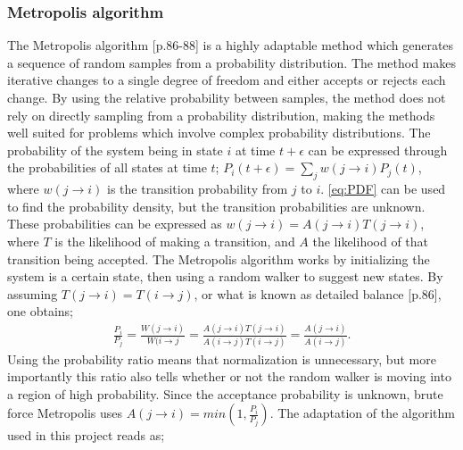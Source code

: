 \documentclass[%
oneside,                 %
final,                   %
10pt]{article}
\begin{document}
\subsubsection{Metropolis algorithm}
The Metropolis algorithm \citep{CMP}[p.86-88] is a highly adaptable method which generates a sequence of random samples from a probability distribution. The method makes iterative changes to a single degree of freedom and either accepts or rejects each change. By using the relative probability between samples, the method does not rely on directly sampling from a probability distribution, making the methods well suited for problems which involve complex probability distributions. 
The probability of the system being in state $i$ at time $t+\epsilon$ can be expressed through the probabilities of all states at time $t$; $P_i(t+\epsilon)=\sum_j w(j\rightarrow i)P_j(t)$, where $w(j\rightarrow i)$ is the transition probability from $j$ to $i$.  \eqref{eq:PDF} can be used to find the probability density, but the transition probabilities are unknown. These probabilities can be expressed as $w(j\rightarrow i)=A(j\rightarrow i) T(j\rightarrow i)$, where $T$ is the likelihood of making a transition, and $A$ the likelihood of that transition being accepted. The Metropolis algorithm works by initializing the system is a certain state, then using a random walker to suggest new states. By assuming $T(j\rightarrow i)=T(i\rightarrow j)$, or what is known as detailed balance \citep{CMP}[p.86], one obtains; \begin{align*}
\frac{P_i}{P_j}= \frac{W(j\rightarrow i)}{W(i\rightarrow j}= \frac{A(j\rightarrow i)T(j\rightarrow i)}{A(i\rightarrow j)T(i\rightarrow j)}=\frac{A(j\rightarrow i)}{A(i\rightarrow j)}.
\end{align*}
Using the probability ratio means that normalization is unnecessary, but more importantly this ratio also tells whether or not the random walker is moving into a region of high probability. Since the acceptance probability is unknown, brute force Metropolis uses $A(j\rightarrow i)=min(1,\frac{P_i}{P_j})$. The adaptation of the algorithm used in this project reads as; 
\end{document}
